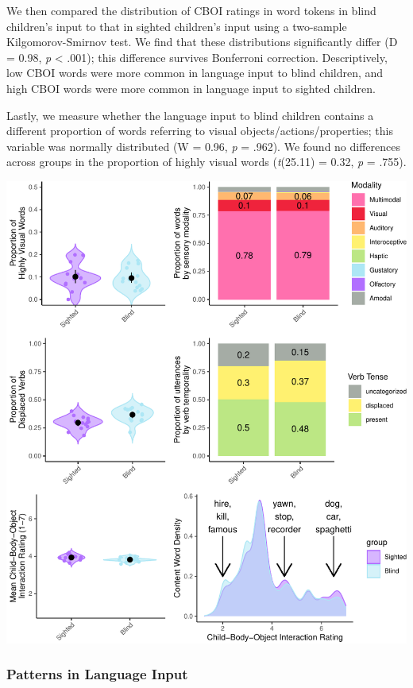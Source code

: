 \documentclass[
  man,floatsintext]{apa6}
\begin{document}
We then compared the distribution of CBOI ratings in word tokens in blind children's input to that in sighted children's input using a two-sample Kilgomorov-Smirnov test. We find that these distributions significantly differ (D = 0.98, \emph{p} \textless{} .001); this difference survives Bonferroni correction. Descriptively, low CBOI words were more common in language input to blind children, and high CBOI words were more common in language input to sighted children.

Lastly, we measure whether the language input to blind children contains a different proportion of words referring to visual objects/actions/properties; this variable was normally distributed (W = 0.96, \emph{p} = .962). We found no differences across groups in the proportion of highly visual words (\emph{t}(25.11) = 0.32, \emph{p} = .755).

\includegraphics{input_quality_manuscript_files/figure-latex/conceptual-plots-1.pdf}

\hypertarget{patterns-in-language-input}{%
\subsubsection{Patterns in Language Input}\label{patterns-in-language-input}}
\end{document}
